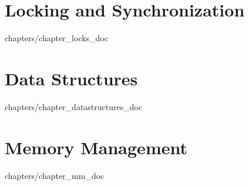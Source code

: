 \documentclass[twoside]{book}
\begin{document}
\chapter{Locking and Synchronization}
 {chapters/chapter_locks_doc}
\chapter{Data Structures}
 {chapters/chapter_datastructures_doc}
\chapter{Memory Management}
 {chapters/chapter_mm_doc}
\end{document}
